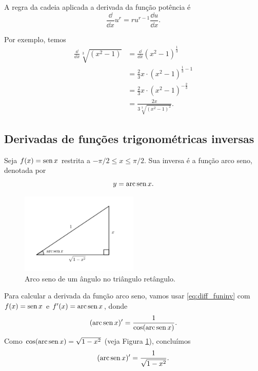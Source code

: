 \begin{ex}
  A regra da cadeia aplicada a derivada da função potência é
  \begin{equation}
    \frac{\dd}{\dd x}u^r = ru^{r-1}\frac{\dd u}{\dd x}.
  \end{equation}
  
  Por exemplo, temos
  \begin{align}
    \frac{\dd}{\dd x}\sqrt[3]{(x^2-1)} &= \frac{\dd}{\dd x}(x^2-1)^{\frac{1}{3}} \\
                                       &= \frac{2}{3}x\cdot (x^2-1)^{\frac{1}{3}-1} \\
                                       &= \frac{2}{3}x\cdot (x^2-1)^{-\frac{2}{3}} \\
                                       &= \frac{2x}{3\sqrt[3]{(x^2-1)^2}}.
  \end{align}
\end{ex}

\subsection{Derivadas de funções trigonométricas inversas}

Seja $f(x) = \operatorname{sen} x$ restrita a $-\pi/2 \leq x \leq \pi/2$. Sua inversa é a função arco seno, denotada por
\begin{equation}
  y = \operatorname{arc}\operatorname{sen} x.
\end{equation}

\begin{figure}[H]
  \centering
  \includegraphics[width=0.5\textwidth]{./cap_deriv/dados/fig_diff_arc_sen/fig_diff_arc_sen}
  \caption{Arco seno de um ângulo no triângulo retângulo.}
  \label{fig:diff_arc_sen}
\end{figure}

Para calcular a derivada da função arco seno, vamos usar \eqref{eq:diff_funinv} com $f(x)=\operatorname{sen} x$ e $f'(x) = \operatorname{arc}\operatorname{sen} x$, donde
\begin{equation}
  (\operatorname{arc}\operatorname{sen} x)' = \frac{1}{\cos(\operatorname{arc}\operatorname{sen} x)}.
\end{equation}
Como $\cos(\operatorname{arc}\operatorname{sen} x) = \sqrt{1-x^2}$ (veja Figura \ref{fig:diff_arc_sen}), concluímos
\begin{equation}
  (\operatorname{arc}\operatorname{sen} x)' = \frac{1}{\sqrt{1-x^2}}.
\end{equation}


